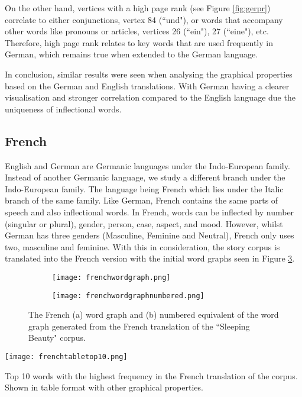 On the other hand, vertices with a high page rank (see Figure \ref{fig:gerpr}) correlate to either conjunctions, vertex 84 (``und"), or words that accompany other words like pronouns or articles, vertices 26 (``ein"), 27 (``eine"), etc. Therefore, high page rank relates to key words that are used frequently in German, which remains true when extended to the German language.

In conclusion, similar results were seen when analysing the graphical properties based on the German and English translations. With German having a clearer visualisation and stronger correlation compared to the English language due the uniqueness of inflectional words.

\subsection{French}
English and German are Germanic languages under the Indo-European family. Instead of another Germanic language, we study a different branch under the Indo-European family. The language being French which lies under the Italic branch of the same family. Like German, French contains the same parts of speech and also inflectional words. In French, words can be inflected by number (singular or plural), gender, person, case, aspect, and mood. However, whilst German has three genders (Masculine, Feminine and Neutral), French \cite{hawkins2015french} only uses two, masculine and feminine. With this in consideration, the story corpus is translated into the French version with the initial word graphs seen in Figure \ref{fig:fregraph}. 

\begin{figure}[!htb]
\centering
\begin{subfigure}{.45\textwidth}
	\texttt{[image: frenchwordgraph.png]}
	\caption{}
	\label{fig:freword}
\end{subfigure}
\hfill
\begin{subfigure}{.45\textwidth}
	\texttt{[image: frenchwordgraphnumbered.png]}
	\caption{}
	\label{fig:frenum}
\end{subfigure}
\caption{The French (a) word graph and (b) numbered equivalent of the word graph generated from the French translation of the ``Sleeping Beauty" corpus.}
\label{fig:fregraph}
\end{figure}

\begin{table}[!htb]
\centering
\texttt{[image: frenchtabletop10.png]}
\caption{Top 10 words with the highest frequency in the French translation of the corpus. Shown in table format with other graphical properties. }
\label{table:frenchtop}
\end{table}

